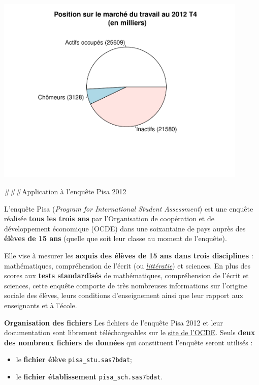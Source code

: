 \documentclass[12pt,twosided, notitlepage]{book}
\providecommand{\tightlist}{%
  \setlength{\itemsep}{0pt}\setlength{\parskip}{0pt}}
\begin{document}
\begin{itemize}
  \begin{center}\includegraphics[width=12cm]{livret_files/figure-latex/unnamed-chunk-443-2} \end{center}
\end{itemize}

\#\#\#Application à l'enquête Pisa 2012

L'enquête Pisa (\textit{Program for International Student Assessment})
est une enquête réalisée \textbf{tous les trois ans} par l'Organisation
de coopération et de développement économique (OCDE) dans une
soixantaine de pays auprès des \textbf{élèves de 15 ans} (quelle que
soit leur classe au moment de l'enquête).

Elle vise à mesurer les \textbf{acquis des élèves de 15 ans dans trois
disciplines} : mathématiques, compréhension de l'écrit (ou
\href{https://fr.wikipedia.org/wiki/Litt\%C3\%A9ratie}{\emph{littératie}})
et sciences. En plus des scores aux \textbf{tests standardisés} de
mathématiques, compréhension de l'écrit et sciences, cette enquête
comporte de très nombreuses informations sur l'origine sociale des
élèves, leurs conditions d'enseignement ainsi que leur rapport aux
enseignants et à l'école.

\textbf{Organisation des fichiers} Les fichiers de l'enquête Pisa 2012
et leur documentation sont librement téléchargeables sur le
\href{http://www.oecd.org/pisa/pisaproducts/pisa2012database-downloadabledata.htm}{site
de l'OCDE}. Seuls \textbf{deux des nombreux fichiers de données} qui
constituent l'enquête seront utilisés :

\begin{itemize}
\tightlist
\item
  le \textbf{fichier élève} \texttt{pisa\_stu.sas7bdat};
\item
  le \textbf{fichier établissement} \texttt{pisa\_sch.sas7bdat}.
\end{itemize}
\end{document}

